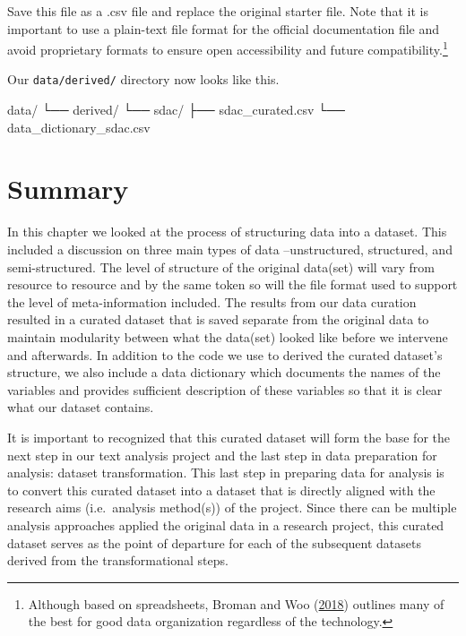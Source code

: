 \documentclass[
  letterpaper,
  DIV=11,
  numbers=noendperiod]{scrreport}
\newenvironment{Shaded}{\begin{snugshade}}{\end{snugshade}}
\newcommand{\ExtensionTok}[1]{\textcolor[rgb]{0.00,0.00,0.00}{#1}}
\newcommand{\NormalTok}[1]{\textcolor[rgb]{0.00,0.00,0.00}{#1}}
\theoremstyle{definition}
\theoremstyle{remark}
\begin{document}
Save this file as a .csv file and replace the original starter file.
Note that it is important to use a plain-text file format for the
official documentation file and avoid proprietary formats to ensure open
accessibility and future compatibility.\footnote{Although based on
  spreadsheets, Broman and Woo
  (\protect\hyperlink{ref-Broman2018}{2018}) outlines many of the best
  for good data organization regardless of the technology.}

Our \texttt{data/derived/} directory now looks like this.

\begin{Shaded}
\begin{Highlighting}[]
\ExtensionTok{data/}
\ExtensionTok{└──}\NormalTok{ derived/}
    \ExtensionTok{└──}\NormalTok{ sdac/}
        \ExtensionTok{├──}\NormalTok{ sdac\_curated.csv}
        \ExtensionTok{└──}\NormalTok{ data\_dictionary\_sdac.csv}
\end{Highlighting}
\end{Shaded}

\hypertarget{summary-8}{%
\section*{Summary}\label{summary-8}}


In this chapter we looked at the process of structuring data into a
dataset. This included a discussion on three main types of data
--unstructured, structured, and semi-structured. The level of structure
of the original data(set) will vary from resource to resource and by the
same token so will the file format used to support the level of
meta-information included. The results from our data curation resulted
in a curated dataset that is saved separate from the original data to
maintain modularity between what the data(set) looked like before we
intervene and afterwards. In addition to the code we use to derived the
curated dataset's structure, we also include a data dictionary which
documents the names of the variables and provides sufficient description
of these variables so that it is clear what our dataset contains.

It is important to recognized that this curated dataset will form the
base for the next step in our text analysis project and the last step in
data preparation for analysis: dataset transformation. This last step in
preparing data for analysis is to convert this curated dataset into a
dataset that is directly aligned with the research aims (i.e.~analysis
method(s)) of the project. Since there can be multiple analysis
approaches applied the original data in a research project, this curated
dataset serves as the point of departure for each of the subsequent
datasets derived from the transformational steps.
\end{document}
